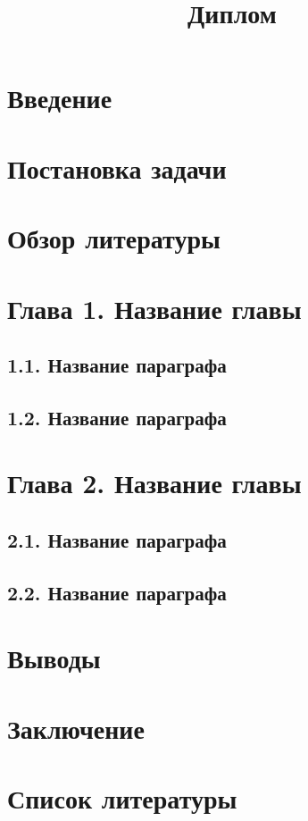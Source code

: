 \documentclass[a4paper, 14pt]{report}
\title{Диплом}
\begin{document}



\tableofcontents %
\clearpage

\section{Введение}

\clearpage

\section{Постановка задачи}

\clearpage

\section{Обзор литературы}

\clearpage

\section{Глава 1. Название главы}
\subsection{1.1. Название параграфа}
\subsection{1.2. Название параграфа}

\clearpage

\section{Глава 2. Название главы}

\subsection{2.1. Название параграфа}
\subsection{2.2. Название параграфа}

\clearpage

\section{Выводы}
\clearpage

\section{Заключение}
\clearpage

\section{Список литературы}
\clearpage
\end{document}
